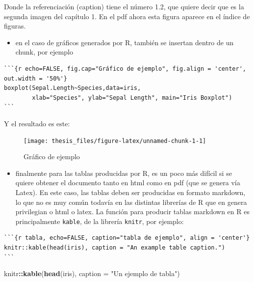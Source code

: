 \documentclass[12pt,twoside]{templates/facsothesis}
\newenvironment{Shaded}{\begin{snugshade}}{\end{snugshade}}
\newcommand{\DataTypeTok}[1]{\textcolor[rgb]{0.13,0.29,0.53}{#1}}
\newcommand{\KeywordTok}[1]{\textcolor[rgb]{0.13,0.29,0.53}{\textbf{#1}}}
\newcommand{\NormalTok}[1]{#1}
\newcommand{\OperatorTok}[1]{\textcolor[rgb]{0.81,0.36,0.00}{\textbf{#1}}}
\newcommand{\StringTok}[1]{\textcolor[rgb]{0.31,0.60,0.02}{#1}}
\providecommand{\tightlist}{%
  \setlength{\itemsep}{0pt}\setlength{\parskip}{0pt}}
\begin{document}
Donde la referenciación (caption) tiene el número 1.2, que quiere decir que es la segunda imagen del capítulo 1. En el pdf ahora esta figura aparece en el índice de figuras.

\begin{itemize}
\tightlist
\item
  en el caso de gráficos generados por R, también se insertan dentro de un chunk, por ejemplo
\end{itemize}

\begin{verbatim}
```{r echo=FALSE, fig.cap="Gráfico de ejemplo", fig.align = 'center', out.width = '50%'}
boxplot(Sepal.Length~Species,data=iris,
        xlab="Species", ylab="Sepal Length", main="Iris Boxplot")
```
\end{verbatim}

Y el resultado es este:

\begin{figure}

{\centering \texttt{[image: thesis\_files/figure-latex/unnamed-chunk-1-1]} 

}

\caption{Gráfico de ejemplo}\label{fig:unnamed-chunk-1}
\end{figure}

\begin{itemize}
\tightlist
\item
  finalmente para las tablas producidas por R, es un poco más difícil si se quiere obtener el documento tanto en html como en pdf (que se genera vía Latex). En este caso, las tablas deben ser producidas en formato markdown, lo que no es muy común todavía en las distintas librerías de R que en genera privilegian o html o latex. La función para producir tablas markdown en R es principalmente \texttt{kable}, de la librería \texttt{knitr}, por ejemplo:
\end{itemize}

\begin{verbatim}
```{r tabla, echo=FALSE, caption="tabla de ejemplo", align = 'center'}
knitr::kable(head(iris), caption = "An example table caption.")
```
\end{verbatim}

\begin{Shaded}
\begin{Highlighting}[]
\NormalTok{knitr}\OperatorTok{::}\KeywordTok{kable}\NormalTok{(}\KeywordTok{head}\NormalTok{(iris), }\DataTypeTok{caption =} \StringTok{"Un ejemplo de tabla"}\NormalTok{)}
\end{Highlighting}
\end{Shaded}
\end{document}
